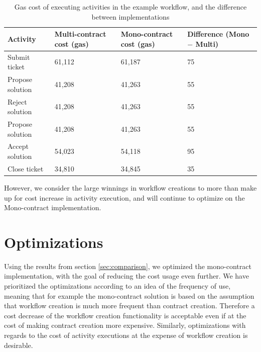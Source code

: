 \documentclass{article}
\begin{document}
	\begin{table}[!ht]
		\centering
		\label{tab:cost-of-executing-activities}
		\begin{tabular}{|p{3cm}|p{2.5cm}|p{2.5cm}|p{2.5cm}|}
			\hline
			Activity                     & Multi-contract cost (gas) & Mono-contract cost (gas) & Difference (Mono $-$ Multi) \\\hline
			Submit ticket                & 61,112          			 & 61,187         			& 75         \\\hline
			Propose solution             & 41,208          			 & 41,263         			& 55         \\\hline
			Reject solution              & 41,208          			 & 41,263         			& 55         \\\hline
			Propose solution             & 41,208          			 & 41,263         			& 55         \\\hline
			Accept solution              & 54,023          			 & 54,118         			& 95         \\\hline
			Close ticket                 & 34,810          			 & 34,845         			& 35         \\\hline
		\end{tabular}
		\caption{Gas cost of executing activities in the example workflow, and the difference between implementations}
	\end{table}

	However, we consider the large winnings in workflow creations to more than make up for cost increase in activity execution, and will continue to optimize on the Mono-contract implementation.

		 



	\section{Optimizations}
		Using the results from section \ref{sec:comparison}, we optimized the mono-contract implementation, with the goal of reducing the cost usage even further.
		We have prioritized the optimizations according to an idea of the frequency of use, meaning that for example the mono-contract solution is based on the assumption that workflow creation is much more frequent than contract creation.
		Therefore a cost decrease of the workflow creation functionality is acceptable even if at the cost of making contract creation more expensive. 
		Similarly, optimizations with regards to the cost of activity executions at the expense of workflow creation is desirable.
\end{document}
